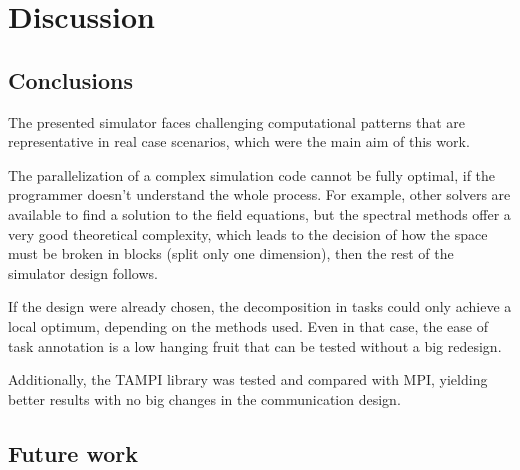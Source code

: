 \chapter{Discussion}
\label{ch:discussion}


\section{Conclusions}

The presented simulator faces challenging computational patterns that are 
representative in real case scenarios, which were the main aim of this work.  


The parallelization of a complex simulation code cannot be fully optimal, if the 
programmer doesn't understand the whole process. For example, other solvers are 
available to find a solution to the field equations, but the spectral methods 
offer a very good theoretical complexity, which leads to the decision of how the 
space must be broken in blocks (split only one dimension), then the rest of the 
simulator design follows.

If the design were already chosen, the decomposition in tasks could only achieve 
a local optimum, depending on the methods used. Even in that case, the ease of 
task annotation is a low hanging fruit that can be tested without a big 
redesign.

Additionally, the TAMPI library was tested and compared with MPI, yielding 
better results with no big changes in the communication design.


\section{Future work}

